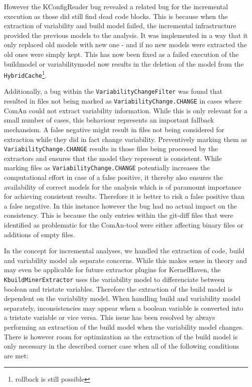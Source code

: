 \documentclass[a4paper]{article}
\begin{document}
However the KConfigReader bug revealed a related bug for the incremental execution as those did still find dead code blocks. This is because when the extraction of variability and build model failed, the incremental infrastructure provided the previous models to the analysis. It was implemented in a way that it only replaced old models with new one - and if no new models were extracted the old ones were simply kept. This has now been fixed as a failed execution of the buildmodel or variabilitymodel now results in the deletion of the model from the \texttt{HybridCache}\footnote{rollback is still possible}.

Additionally, a bug within the \texttt{VariabilityChangeFilter} was found that resulted in files not being marked as \texttt{VariabilityChange.CHANGE} in cases where ComAn could not extract variability information. While this is only relevant for a small number of cases, this behaviour represents an important fallback mechansism. A false negative might result in files not being considered for extraction while they did in fact change variability. Preventively marking them as \texttt{VariabilityChange.CHANGE} results in those files being processed by the extractors and ensures that the model they represent is consistent. While marking files as \texttt{VariabilityChange.CHANGE} potentially increases the computational effort in case of a false positive, it thereby also ensures the availability of correct models for the analysis which is of paramount importance for achieving consistent results. Therefore it is better to risk a false positive than a false negative. In this instance however the bug had no actual impact on the consistency. This is because the only entries within the git-diff files that were identified as problematic for the ComAn-tool were either affecting binary files or additions of empty files.

In the concept for incremental analyses, we handled the extraction of code, build and variability model als separate concerns. While this makes sense in theory and may even be applicable for future extractor plugins for KernelHaven, the \texttt{KbuildMinerExtractor} uses the variability model to differenciate between boolean and tristate variables. Therefore the extraction of the build model is dependent on the variability model. When handling build and variability model separately, inconsistencies may appear when a boolean variable is converted into a tristate variable or vice versa. This issue has been resolved by always performing an extraction of the build model when the variability model changes. There is however room for optimization as the extraction of the build model is only necessary in the described corner case when all of the following conditions are met:
\end{document}
